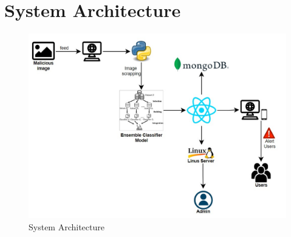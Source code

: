 \section{System Architecture}
\begin{figure}[H]
    \includegraphics[width=150mm]{./img/System architecture.jpg}
    \caption{System Architecture}
\end{figure}
\clearpage 
